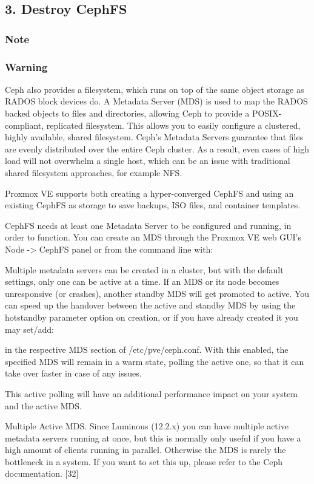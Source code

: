 \subsection{3. Destroy CephFS}

\subsubsection{Note}

\subsubsection{Warning}

Ceph also provides a filesystem, which runs on top of the same object storage as RADOS block devices do. A Metadata Server (MDS) is used to map the RADOS backed objects to files and directories, allowing Ceph to provide a POSIX-compliant, replicated filesystem. This allows you to easily configure a clustered, highly available, shared filesystem. Ceph’s Metadata Servers guarantee that files are evenly distributed over the entire Ceph cluster. As a result, even cases of high load will not overwhelm a single host, which can be an issue with traditional shared filesystem approaches, for example NFS.

Proxmox VE supports both creating a hyper-converged CephFS and using an existing CephFS as storage to save backups, ISO files, and container templates.

CephFS needs at least one Metadata Server to be configured and running, in order to function. You can create an MDS through the Proxmox VE web GUI’s Node -> CephFS panel or from the command line with:

Multiple metadata servers can be created in a cluster, but with the default settings, only one can be active at a time. If an MDS or its node becomes unresponsive (or crashes), another standby MDS will get promoted to active. You can speed up the handover between the active and standby MDS by using the hotstandby parameter option on creation, or if you have already created it you may set/add:

in the respective MDS section of /etc/pve/ceph.conf. With this enabled, the specified MDS will remain in a warm state, polling the active one, so that it can take over faster in case of any issues.

This active polling will have an additional performance impact on your system and the active MDS.

Multiple Active MDS. Since Luminous (12.2.x) you can have multiple active metadata servers running at once, but this is normally only useful if you have a high amount of clients running in parallel. Otherwise the MDS is rarely the bottleneck in a system. If you want to set this up, please refer to the Ceph documentation. [32]

